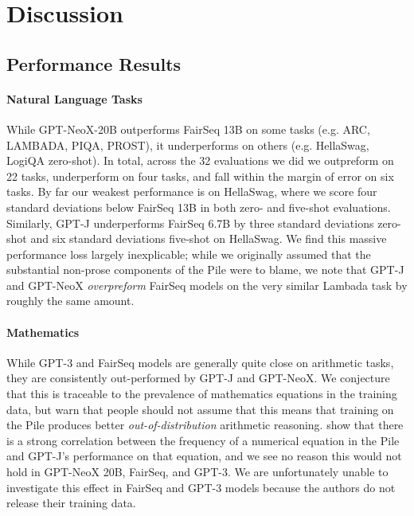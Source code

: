 \documentclass[11pt]{article}
\newcommand{\model}{GPT-NeoX-20B}
\begin{document}
\section{Discussion}

\subsection{Performance Results}

\paragraph{Natural Language Tasks}  While \model{} outperforms FairSeq 13B on some tasks (e.g. ARC, LAMBADA, PIQA, PROST), it underperforms on others (e.g. HellaSwag, LogiQA zero-shot). In total, across the 32 evaluations we did we outpreform on 22 tasks, underperform on four tasks, and fall within the margin of error on six tasks. By far our weakest performance is on HellaSwag, where we score four standard deviations below FairSeq 13B in both zero- and five-shot evaluations. Similarly, GPT-J underperforms FairSeq 6.7B by three standard deviations zero-shot and six standard deviations five-shot on HellaSwag. We find this massive performance loss largely inexplicable; while we originally assumed that the substantial non-prose components of the Pile were to blame, we note that GPT-J and GPT-NeoX \textit{overpreform} FairSeq models on the very similar Lambada task by roughly the same amount.

\paragraph{Mathematics} While GPT-3 and FairSeq models are generally quite close on arithmetic tasks, they are consistently out-performed by GPT-J and GPT-NeoX. We conjecture that this is traceable to the prevalence of mathematics equations in the training data, but warn that people should not assume that this means that training on the Pile produces better \textit{out-of-distribution} arithmetic reasoning. \citet{razeghi2022impact} show that there is a strong correlation between the frequency of a numerical equation in the Pile and GPT-J's performance on that equation, and we see no reason this would not hold in GPT-NeoX 20B, FairSeq, and GPT-3. We are unfortunately unable to investigate this effect in FairSeq and GPT-3 models because the authors do not release their training data.
\end{document}
